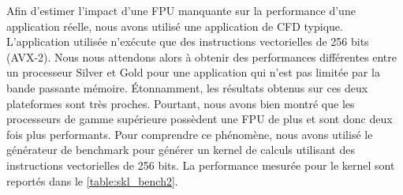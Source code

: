         \begin{table}[h!]
        \centering
        
        \caption{Pour différents processeur, le nombre d'instruction FMA AVX-512 pouvant être exécutée chaque cycle a été mesuré à l'aide du \texttt{Kernel Generator}. En fonction du nombre de FPU présent sur un coeur (1 ou 2), le nombre d'instructions exécuté varie (1 ou 2). La performance \gls{flopsmax} du benchmark HPL mesurée GFLOPS varie de la même façon suivant la gamme du processeur utilisé. Afin de pouvoir comparer les différentes gammes de processeurs la configuration suivante à été appliqué à chaque processeur: désactivation de l'\textit{hyperthreading}, fréquence limitée à 1.5 GHz, utilisation de 8 coeurs. \textbf{todo: revoir les valeurs}}
        \label{table:skl_bench}
        \end{table}
        
        
        Afin d'estimer l'impact d'une FPU manquante sur la performance d'une application réelle, nous avons utilisé une application de CFD typique. L'application utilisée n'exécute que des instructions vectorielles de 256 bits (AVX-2). Nous nous attendons alors à obtenir des performances différentes entre un processeur Silver et Gold pour une application qui n'est pas limitée par la bande passante mémoire. Étonnamment, les résultats obtenus sur ces deux plateformes sont très proches. Pourtant, nous avons bien montré que les processeurs de gamme supérieure possèdent une FPU de plus et sont donc deux fois plus performants. Pour comprendre ce phénomène, nous avons utilisé le générateur de benchmark pour générer un kernel de calculs utilisant des instructions vectorielles de 256 bits. La performance mesurée pour le kernel sont reportés dans le \autoref{table:skl_bench2}.  
        
